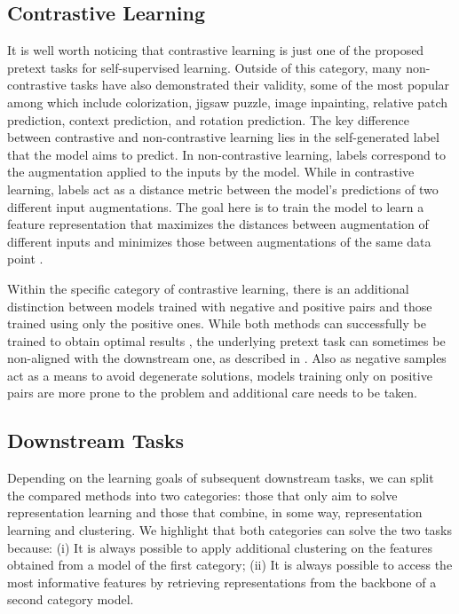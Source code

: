 \documentclass{article}
\begin{document}
\subsection{Contrastive Learning}
It is well worth noticing that contrastive learning is just one of the proposed pretext tasks for self-supervised learning. Outside of this category, many non-contrastive tasks have also demonstrated their validity,  some of the most popular among which include colorization, jigsaw puzzle, image inpainting, relative patch prediction, context prediction, and rotation prediction\cite{self_classifier}\cite{byol}. 
The key difference between contrastive and non-contrastive learning lies in the self-generated label that the model aims to predict. In non-contrastive learning, labels correspond to the augmentation applied to the inputs by the model. While in contrastive learning, labels act as a distance metric between the model's predictions of two different input augmentations. The goal here is to train the model to learn a feature representation that maximizes the distances between augmentation of different inputs and minimizes those between augmentations of the same data point \cite{byol}. 

Within the specific category of contrastive learning, there is an additional distinction between models trained with negative and positive pairs and those trained using only the positive ones. 
While both methods can successfully be trained to obtain optimal results \cite{simclr}, the underlying pretext task can sometimes be non-aligned with the downstream one, as described in \cite{self_classifier}. Also as negative samples act as a means to avoid degenerate solutions, models training only on positive pairs are more prone to the problem and additional care needs to be taken. 


\subsection{Downstream Tasks}
Depending on the learning goals of subsequent downstream tasks, we can split the compared methods into two categories: those that only aim to solve representation learning and those that combine, in some way, representation learning and clustering. We highlight that both categories can solve the two tasks because: (i) It is always possible to apply additional clustering on the features obtained from a model of the first category; (ii) It is always possible to access the most informative features by retrieving representations from the backbone of a second category model. 
\end{document}
